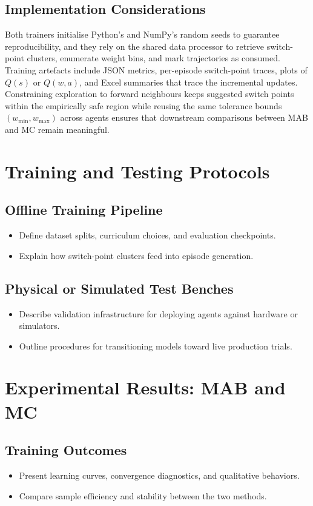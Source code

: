 \documentclass[journal]{IEEEtranTIE}
\begin{document}
\subsection{Implementation Considerations}
Both trainers initialise Python's and NumPy's random seeds to guarantee reproducibility, and they rely on the shared data processor to retrieve switch-point clusters, enumerate weight bins, and mark trajectories as consumed. Training artefacts include JSON metrics, per-episode switch-point traces, plots of $Q(s)$ or $Q(w,a)$, and Excel summaries that trace the incremental updates. Constraining exploration to forward neighbours keeps suggested switch points within the empirically safe region while reusing the same tolerance bounds $(w_{\min},w_{\max})$ across agents ensures that downstream comparisons between MAB and MC remain meaningful.

\section{Training and Testing Protocols}
\subsection{Offline Training Pipeline}
\begin{itemize}
  \item Define dataset splits, curriculum choices, and evaluation checkpoints.
  \item Explain how switch-point clusters feed into episode generation.
\end{itemize}
\subsection{Physical or Simulated Test Benches}
\begin{itemize}
  \item Describe validation infrastructure for deploying agents against hardware or simulators.
  \item Outline procedures for transitioning models toward live production trials.
\end{itemize}

\section{Experimental Results: MAB and MC}
\subsection{Training Outcomes}
\begin{itemize}
  \item Present learning curves, convergence diagnostics, and qualitative behaviors.
  \item Compare sample efficiency and stability between the two methods.
\end{itemize}
\end{document}
